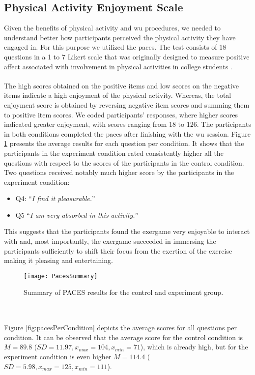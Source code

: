 \subsection{Physical Activity Enjoyment Scale}
Given the benefits of physical activity and \acrshort{wu} procedures, we needed to understand better how participants perceived the physical activity they have engaged in. For this purpose we utilized the \acrfull{paces}. The test consists of 18 questions in a 1 to 7 Likert scale that was originally designed to measure positive affect associated with involvement in physical activities in college students \cite{kendzierski1991physical}.  \\\\The high scores obtained on the positive items and low scores on the negative items indicate a high enjoyment of the physical activity. Whereas, the total enjoyment score is obtained by reversing negative item scores and summing them to positive item scores. We coded participants' responses, where higher scores indicated greater enjoyment, with scores ranging from 18 to 126. The participants in both conditions completed the \gls{paces} after finishing with the \acrshort{wu} session. Figure \ref{fig:pacees} presents the average results for each question per condition. It shows that the participants in the experiment condition rated consistently higher all the questions with respect to the scores of the participants in the control condition. Two questions received notably much higher score by the participants in the experiment condition: \begin{itemize}
\item Q4: ``\textit{I find it pleasurable.}''
\item Q5 ``\textit{I am very absorbed in this activity.}''
\end{itemize} 
This suggests that the participants found the exergame very enjoyable to interact with  and, most importantly, the exergame succeeded in immersing the participants sufficiently to shift their focus from the exertion of the exercise making it pleasing and entertaining.\\
\begin{figure}[h]
    \centering
    \texttt{[image: PacesSummary]}
    \caption{Summary of PACES results for the control and experiment group.}
    \label{fig:pacees}
\end{figure}\\\\
Figure \ref{fig:pacesPerCondition} depicts the average scores for all questions per condition. It can be observed that the average score for the control condition is \begin{math}M = 89.8 \end{math} (\begin{math} SD = 11.97, x_{max}= 104, x_{min}= 71\end{math}), which is already high, but for the experiment condition is even higher  \begin{math}M = 114.4 \end{math} (\begin{math} SD = 5.98, x_{max}= 125, x_{min}= 111\end{math}).\\
